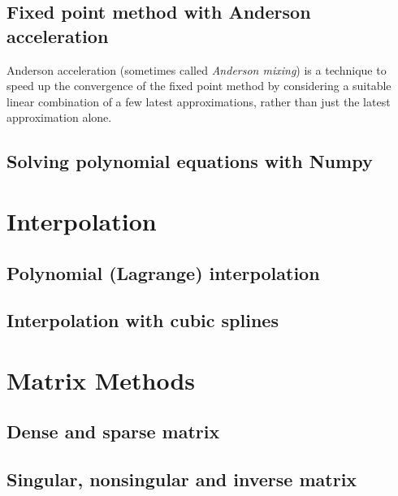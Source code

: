\documentclass[article,A4,12pt]{llncs}
\begin{document}
\subsection{Fixed point method with Anderson acceleration}

Anderson acceleration (sometimes called {\em Anderson mixing}) is a technique
to speed up the convergence of the fixed point method by considering 
a suitable linear combination of a few latest approximations, rather than 
just the latest approximation alone. 





\subsection{Solving polynomial equations with Numpy}





\section{Interpolation}





\subsection{Polynomial (Lagrange) interpolation}




\subsection{Interpolation with cubic splines}



\section{Matrix Methods}



\subsection{Dense and sparse matrix}


\subsection{Singular, nonsingular and inverse matrix}
\end{document}
